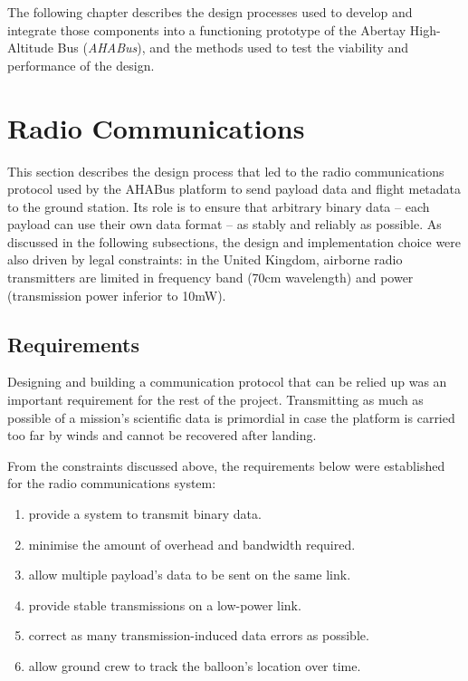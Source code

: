 The following chapter describes the design processes used to develop and
integrate those components into a functioning prototype of the Abertay
High-Altitude Bus (\textit{AHABus}), and the methods used to test the viability
and performance of the design.

\section{Radio Communications}

This section describes the design process that led to the radio communications
protocol used by the AHABus platform to send payload data and flight metadata
to the ground station. Its role is to ensure that arbitrary binary data – each
payload can use their own data format – as stably and reliably as possible. As
discussed in the following subsections, the design and implementation choice
were also driven by legal constraints: in the United Kingdom, airborne radio
transmitters are limited in frequency band (70cm wavelength) and power
(transmission power inferior to 10mW).

\subsection{Requirements}
\label{ssec:requirements}

Designing and building a communication protocol that can be relied up was an
important requirement for the rest of the project. Transmitting as much as
possible of a mission's scientific data is primordial in case the platform
is carried too far by winds and cannot be recovered after landing.

From the constraints discussed above, the requirements below were established
for the radio communications system:

\begin{enumerate}
\item provide a system to transmit binary data.%
\item minimise the amount of overhead and bandwidth required.%
\item allow multiple payload's data to be sent on the same link.%
\item provide stable transmissions on a low-power link.%
\item correct as many transmission-induced data errors as possible.%
\item allow ground crew to track the balloon's location over time.%
\end{enumerate}

